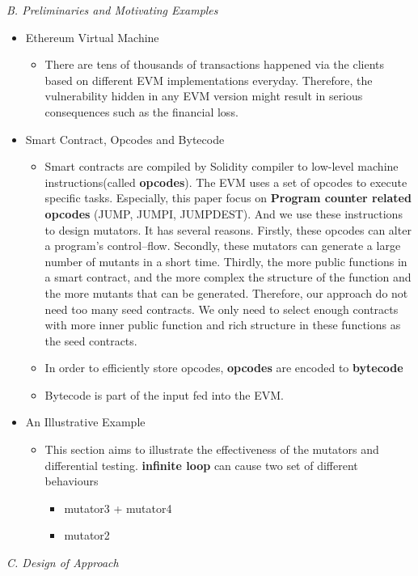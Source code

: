 \documentclass[a4paper]{article}
\begin{document}
	\textit{B. Preliminaries and Motivating Examples}
	\begin{itemize}
		\item Ethereum Virtual Machine
		\begin{itemize}
			\item  There are tens
			of thousands of transactions happened via the clients based on
			different EVM implementations everyday. Therefore, the vulnerability
			hidden in any EVM version might result in serious consequences such as the financial loss.
		\end{itemize}
		\item Smart Contract, Opcodes and Bytecode
		\begin{itemize}
			\item Smart contracts are compiled by Solidity compiler to low-level machine instructions(called \textbf{opcodes}). The EVM uses a set of opcodes to execute specific tasks. Especially, this paper focus on \textbf{Program counter related opcodes} (JUMP, JUMPI, JUMPDEST). And we use these instructions to design mutators. It has several reasons. Firstly, these opcodes can alter a program's control--flow. Secondly, these mutators can generate a large number of mutants in a short time. Thirdly, 
			the more public functions in a smart contract, and the more complex the structure of the function and the more mutants that can be generated. Therefore, our approach do not need too many seed contracts. We only need to select enough contracts with more inner public function and rich structure in these functions as the seed contracts.
			\item In order to efficiently store opcodes, \textbf{opcodes} are encoded to \textbf{bytecode}
			\item Bytecode is part of the input fed into the EVM.
		\end{itemize}
		\item{An Illustrative Example}
		\begin{itemize}
			\item This section aims to illustrate the effectiveness of the mutators and differential testing. \textbf{infinite loop} can cause two set of different behaviours
			\begin{itemize}
				\item mutator3 + mutator4
				\item mutator2
			\end{itemize}
		\end{itemize}
	\end{itemize}
	\textit{C. Design of Approach}
\end{document}
